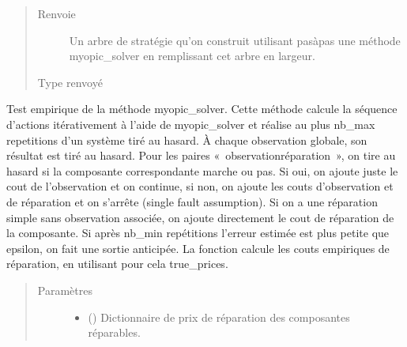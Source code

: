 \documentclass[letterpaper,10pt,french]{sphinxmanual}
\begin{document}
\begin{fulllineitems}
\begin{fulllineitems}
\begin{quote}
\begin{description}
\item[{Renvoie}] \leavevmode
{} \textendash{} Un arbre de stratégie qu’on construit utilisant pas\sphinxhyphen{}à\sphinxhyphen{}pas une méthode myopic\_solver en remplissant cet arbre
en largeur.

\item[{Type renvoyé}] \leavevmode
{\hyperref[\detokenize{index:StrategyTree.StrategyTree}]{}}

\end{description}\end{quote}

\end{fulllineitems}


\begin{fulllineitems}
\label{\detokenize{index:DecisionTheoreticTroubleshooting.TroubleShootingProblem.myopic_solver_tester}}
Test empirique de la méthode myopic\_solver. Cette méthode calcule
la séquence d’actions itérativement à l’aide de myopic\_solver et
réalise au plus nb\_max repetitions d’un système tiré au hasard. À
chaque observation globale, son résultat est tiré au hasard. Pour les
paires « observation\sphinxhyphen{}réparation », on tire au hasard si la composante
correspondante marche ou pas. Si oui, on ajoute juste le cout de
l’observation et on continue, si non, on ajoute les couts d’observation
et de réparation et on s’arrête (single fault assumption). Si on a
une réparation simple sans observation associée, on ajoute directement
le cout de réparation de la composante. Si après nb\_min repétitions
l’erreur estimée est plus petite que epsilon, on fait une sortie
anticipée. La fonction calcule les couts empiriques de réparation, en
utilisant pour cela true\_prices.
\begin{quote}\begin{description}
\item[{Paramètres}] \leavevmode\begin{itemize}
\item {} 
 () \textendash{} Dictionnaire de prix de réparation des composantes réparables.


\end{itemize}
\end{description}
\end{quote}
\end{fulllineitems}
\end{fulllineitems}
\end{document}
